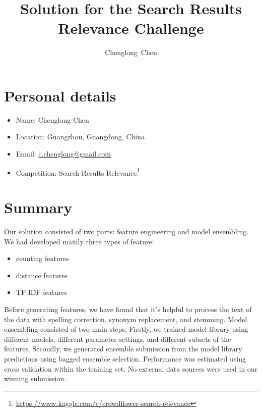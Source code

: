\documentclass[12pt]{article}
\begin{document}
\title{Solution for the Search Results Relevance Challenge}
\author{Chenglong~Chen}
\maketitle


\section*{Personal details}
\begin{itemize}
\item Name: Chenglong Chen
\item Location: Guangzhou, Guangdong, China
\item Email: \url{c.chenglong@gmail.com}
\item Competition: Search Results Relevance\footnote{\url{https://www.kaggle.com/c/crowdflower-search-relevance}}
\end{itemize}

\newpage
\tableofcontents

\newpage
\section{Summary}
Our solution consisted of two parts: feature engineering and model ensembling. We had developed mainly three types of feature:
\begin{itemize}
\item counting features
\item distance features
\item TF-IDF features
\end{itemize}
Before generating features, we have found that it's helpful to process the text of the data with spelling correction, synonym replacement, and stemming. Model ensembling consisted of two main steps, Firstly, we trained model library using different models, different parameter settings, and different subsets of the features. Secondly, we generated ensemble submission from the model library predictions using bagged ensemble selection. Performance was estimated using cross validation within the training set. No external data sources were used in our winning submission.
\end{document}
